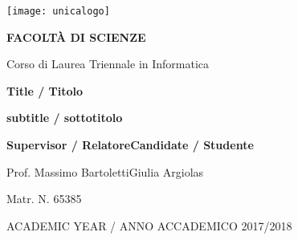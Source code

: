 \begin{spacing}{0.90}
\begin{center}
{\Large \thispagestyle{empty}}{\texttt{[image: unicalogo]}}\par
\end{center}
\end{spacing}

\noindent 
\begin{center}
\vspace{0.7cm}
\textbf{}\par
\end{center}{\LARGE \par}

\noindent 
\begin{center}
\textbf{\large FACOLT\`A DI SCIENZE}\par
\end{center}{\large \par}

\noindent
\begin{center}
{\large Corso di Laurea Triennale in Informatica}\par  %
\end{center}{\large \par}

\vspace{2.6cm}


\begin{center}
\textbf{\LARGE Title / Titolo}\par
\end{center}{\LARGE \par}

\begin{center}
\textbf{\large subtitle / sottotitolo}\par
\end{center}{\LARGE \par}

\begin{spacing}{0.90}
\vspace{3.7cm}
\textbf{\large Supervisor / Relatore}{\large \hfill{}}\textbf{\large Candidate / Studente}{\large \par}
\end{spacing}

{\large Prof. Massimo Bartoletti\hfill{}Giulia Argiolas~}{\large \par}

\begin{spacing}{0.90}
{\large \hfill{}Matr. N. 65385}{\large \par}
\end{spacing}

\vspace{2.5cm}


\begin{center}
ACADEMIC YEAR / ANNO ACCADEMICO 2017/2018\par 
\end{center}